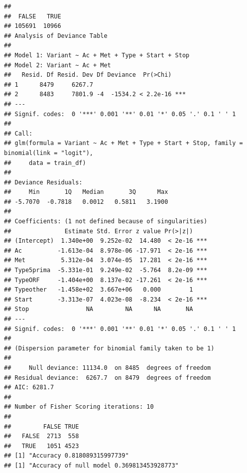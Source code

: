 \documentclass{article}\usepackage[]{graphicx}\usepackage[]{color}
\makeatletter
\newenvironment{kframe}{%
 \def\at@end@of@kframe{}%
 \ifinner\ifhmode%
  \def\at@end@of@kframe{\end{minipage}}%
  \begin{minipage}{\columnwidth}%
 \fi\fi%
 \def\FrameCommand##1{\hskip\@totalleftmargin \hskip-\fboxsep
 \colorbox{shadecolor}{##1}\hskip-\fboxsep
     \hskip-\linewidth \hskip-\@totalleftmargin \hskip\columnwidth}%
 \MakeFramed {\advance\hsize-\width
   \@totalleftmargin\z@ \linewidth\hsize
   \@setminipage}}%
 {\par\unskip\endMakeFramed%
 \at@end@of@kframe}
\newenvironment{knitrout}{}{} %
\makeatother
\begin{document}
\begin{knitrout}
\color{fgcolor}\begin{kframe}
\begin{verbatim}
## 
##  FALSE   TRUE 
## 105691  10966
## Analysis of Deviance Table
## 
## Model 1: Variant ~ Ac + Met + Type + Start + Stop
## Model 2: Variant ~ Ac + Met
##   Resid. Df Resid. Dev Df Deviance  Pr(>Chi)    
## 1      8479     6267.7                          
## 2      8483     7801.9 -4  -1534.2 < 2.2e-16 ***
## ---
## Signif. codes:  0 '***' 0.001 '**' 0.01 '*' 0.05 '.' 0.1 ' ' 1
## 
## Call:
## glm(formula = Variant ~ Ac + Met + Type + Start + Stop, family = binomial(link = "logit"), 
##     data = train_df)
## 
## Deviance Residuals: 
##     Min       1Q   Median       3Q      Max  
## -5.7070  -0.7818   0.0012   0.5811   3.1900  
## 
## Coefficients: (1 not defined because of singularities)
##               Estimate Std. Error z value Pr(>|z|)    
## (Intercept)  1.340e+00  9.252e-02  14.480  < 2e-16 ***
## Ac          -1.613e-04  8.978e-06 -17.971  < 2e-16 ***
## Met          5.312e-04  3.074e-05  17.281  < 2e-16 ***
## Type5prima  -5.331e-01  9.249e-02  -5.764  8.2e-09 ***
## TypeORF     -1.404e+00  8.137e-02 -17.261  < 2e-16 ***
## Typeother   -1.458e+02  3.667e+06   0.000        1    
## Start       -3.313e-07  4.023e-08  -8.234  < 2e-16 ***
## Stop                NA         NA      NA       NA    
## ---
## Signif. codes:  0 '***' 0.001 '**' 0.01 '*' 0.05 '.' 0.1 ' ' 1
## 
## (Dispersion parameter for binomial family taken to be 1)
## 
##     Null deviance: 11134.0  on 8485  degrees of freedom
## Residual deviance:  6267.7  on 8479  degrees of freedom
## AIC: 6281.7
## 
## Number of Fisher Scoring iterations: 10
##        
##         FALSE TRUE
##   FALSE  2713  558
##   TRUE   1051 4523
## [1] "Accuracy 0.818089315997739"
## [1] "Accuracy of null model 0.369813453928773"
\end{verbatim}


{\ttfamily\noindent\itshape\color{messagecolor}{\#\# Loading required package: gplots}}

{\ttfamily\noindent\itshape\color{messagecolor}{\#\# \\\#\# Attaching package: 'gplots'}}


\end{kframe}
\end{knitrout}
\end{document}
